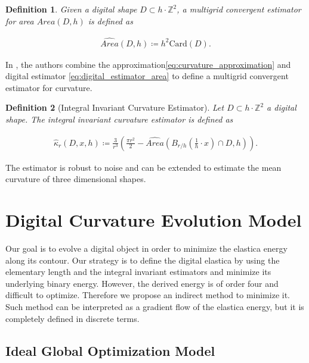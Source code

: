 \documentclass[runningheads]{llncs}
\newtheorem{ddef}{Definition}
\begin{document}
	\begin{ddef}	
		Given a digital shape $D \subset h \cdot \mathbb{Z}^2$, a multigrid convergent estimator for area $\widehat{Area}(D,h)$ is defined as	
		
		\begin{align}
			\widehat{Area}(D,h) \coloneqq h^2\text{Card}\left( D \right).			
			\label{eq:digital_estimator_area}
		\end{align}

	\end{ddef}
	
	In \cite{coeurjolly13}, the authors combine the approximation\eqref{eq:curvature_approximation} and digital estimator \eqref{eq:digital_estimator_area} to define a multigrid convergent estimator for curvature.

	\begin{ddef}[Integral Invariant Curvature Estimator]
		Let $D \subset h \cdot \mathbb{Z}^2$ a digital shape. The integral invariant curvature estimator is defined as
		
		\begin{align*}
			\hat{\kappa}_{r}(D,x,h) \coloneqq \frac{3}{r^3} \left( \frac{\pi r^2}{2} - \widehat{Area} \left( B_{r/h} ( \frac{1}{h} \cdot x ) \cap D, h \right) \right).
		\end{align*}
	\end{ddef}
	

	The estimator is robust to noise and can be extended to estimate the mean curvature of three dimensional shapes.
	

\section{Digital Curvature Evolution Model}


Our goal is to evolve a digital object in order to minimize the elastica energy along its contour. Our strategy is to define the digital elastica by using the elementary length and the integral invariant estimators and minimize its underlying binary energy. However, the derived energy is of order four and difficult to optimize. Therefore we propose an indirect method to minimize it. Such method can be interpreted as a gradient flow of the elastica energy, but it is completely defined in discrete terms.




\subsection{Ideal Global Optimization Model}
\end{document}
